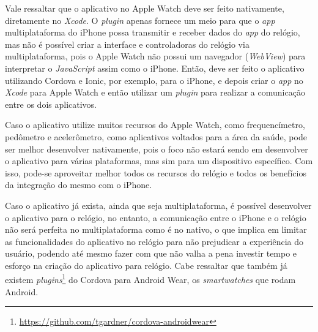 Vale ressaltar que o aplicativo no Apple Watch deve ser feito nativamente, diretamente no \textit{Xcode}. O \textit{plugin} apenas fornece um meio para que o \textit{app} multiplataforma do iPhone possa transmitir e receber 
dados do \textit{app} do relógio, mas não é possível criar a interface e controladoras do relógio via multiplataforma, pois o Apple Watch não possui um navegador (\textit{WebView}) para interpretar o \textit{JavaScript} assim 
como o iPhone. Então, deve ser feito o aplicativo utilizando Cordova e Ionic, por exemplo, para o iPhone, e depois criar o \textit{app} no \textit{Xcode} para Apple Watch e então utilizar um \textit{plugin} para realizar a 
comunicação entre os dois aplicativos.  

Caso o aplicativo utilize muitos recursos do Apple Watch, como frequencímetro, pedômetro e acelerômetro, como aplicativos voltados para a área da saúde, pode ser melhor desenvolver nativamente,
pois o foco não estará sendo em desenvolver o aplicativo para várias plataformas, mas sim para um dispositivo específico. Com isso, pode-se aproveitar melhor todos os recursos do relógio e todos os benefícios da integração
do mesmo com o iPhone.

Caso o aplicativo já exista, ainda que seja multiplataforma, é possível desenvolver o aplicativo para o relógio, no entanto, a comunicação entre o iPhone e o relógio não será perfeita no multiplataforma como é no nativo, 
o que implica em limitar as funcionalidades do aplicativo no relógio para não prejudicar a experiência do usuário, podendo até mesmo fazer com que não valha a pena investir tempo e esforço na criação do aplicativo para
relógio. Cabe ressaltar que também já existem \textit{plugins}\footnote{\url{https://github.com/tgardner/cordova-androidwear}} do Cordova para Android Wear, os \textit{smartwatches} que rodam Android.

